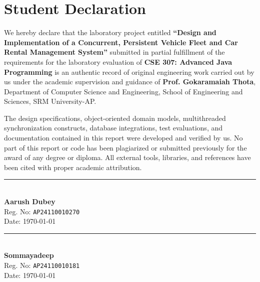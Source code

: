 \documentclass[11pt,a4paper]{article}
\begin{document}
\newpage
\thispagestyle{plain}
\section*{Student Declaration}

We hereby declare that the laboratory project entitled \textbf{``Design and Implementation of a Concurrent, Persistent Vehicle Fleet and Car Rental Management System''} submitted in partial fulfillment of the requirements for the laboratory evaluation of \textbf{CSE 307: Advanced Java Programming} is an authentic record of original engineering work carried out by us under the academic supervision and guidance of \textbf{Prof. Gokaramaiah Thota}, Department of Computer Science and Engineering, School of Engineering and Sciences, SRM University-AP.

The design specifications, object-oriented domain models, multithreaded synchronization constructs, database integrations, test evaluations, and documentation contained in this report were developed and verified by us. No part of this report or code has been plagiarized or submitted previously for the award of any degree or diploma. All external tools, libraries, and references have been cited with proper academic attribution.

\vspace{2.2cm}

\noindent
\begin{minipage}{0.48\textwidth}
    \begin{flushleft}
        \rule{6cm}{0.4pt}\\
        \textbf{Aarush Dubey}\\
        Reg. No: \texttt{AP24110010270}\\
        Date: \today
    \end{flushleft}
\end{minipage}
\hfill
\begin{minipage}{0.48\textwidth}
    \begin{flushright}
        \rule{6cm}{0.4pt}\\
        \textbf{Sommayadeep}\\
        Reg. No: \texttt{AP24110010181}\\
        Date: \today
    \end{flushright}
\end{minipage}
\end{document}
